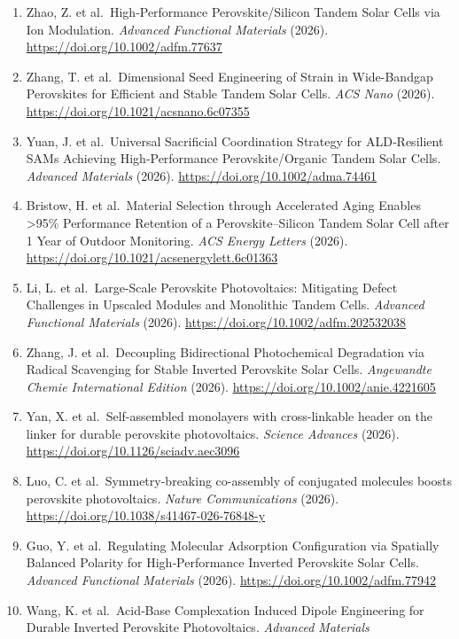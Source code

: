 \documentclass[
  11pt,
]{article}
\begin{document}
\begin{enumerate}
\item
  Zhao, Z. et al.~High‐Performance Perovskite/Silicon Tandem Solar Cells
  via Ion Modulation. \emph{Advanced Functional Materials} (2026).
  \url{https://doi.org/10.1002/adfm.77637}
\item
  Zhang, T. et al.~Dimensional Seed Engineering of Strain in
  Wide-Bandgap Perovskites for Efficient and Stable Tandem Solar Cells.
  \emph{ACS Nano} (2026). \url{https://doi.org/10.1021/acsnano.6c07355}
\item
  Yuan, J. et al.~Universal Sacrificial Coordination Strategy for
  ALD‐Resilient SAMs Achieving High‐Performance Perovskite/Organic
  Tandem Solar Cells. \emph{Advanced Materials} (2026).
  \url{https://doi.org/10.1002/adma.74461}
\item
  Bristow, H. et al.~Material Selection through Accelerated Aging
  Enables \textgreater95\% Performance Retention of a
  Perovskite--Silicon Tandem Solar Cell after 1 Year of Outdoor
  Monitoring. \emph{ACS Energy Letters} (2026).
  \url{https://doi.org/10.1021/acsenergylett.6c01363}
\item
  Li, L. et al.~Large‐Scale Perovskite Photovoltaics: Mitigating Defect
  Challenges in Upscaled Modules and Monolithic Tandem Cells.
  \emph{Advanced Functional Materials} (2026).
  \url{https://doi.org/10.1002/adfm.202532038}
\item
  Zhang, J. et al.~Decoupling Bidirectional Photochemical Degradation
  via Radical Scavenging for Stable Inverted Perovskite Solar Cells.
  \emph{Angewandte Chemie International Edition} (2026).
  \url{https://doi.org/10.1002/anie.4221605}
\item
  Yan, X. et al.~Self-assembled monolayers with cross-linkable header on
  the linker for durable perovskite photovoltaics. \emph{Science
  Advances} (2026). \url{https://doi.org/10.1126/sciadv.aec3096}
\item
  Luo, C. et al.~Symmetry-breaking co-assembly of conjugated molecules
  boosts perovskite photovoltaics. \emph{Nature Communications} (2026).
  \url{https://doi.org/10.1038/s41467-026-76848-y}
\item
  Guo, Y. et al.~Regulating Molecular Adsorption Configuration via
  Spatially Balanced Polarity for High‐Performance Inverted Perovskite
  Solar Cells. \emph{Advanced Functional Materials} (2026).
  \url{https://doi.org/10.1002/adfm.77942}
\item
  Wang, K. et al.~Acid‐Base Complexation Induced Dipole Engineering for
  Durable Inverted Perovskite Photovoltaics. \emph{Advanced Materials}

\end{enumerate}
\end{document}
